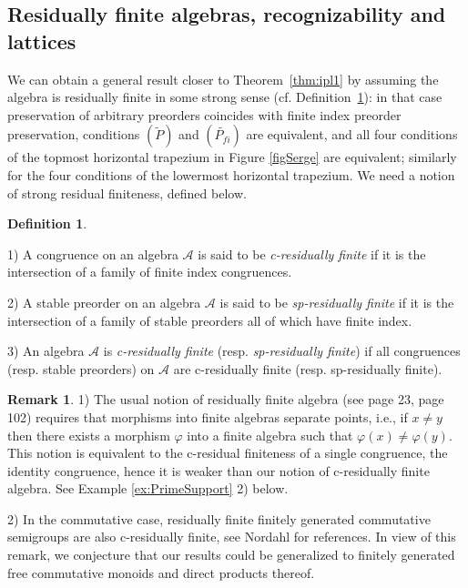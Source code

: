 \documentclass[11pt,a4paper]{article}
\theoremstyle{definition} %
\newtheorem{definition}[theorem]{Definition}
\newtheorem{remark}[theorem]{Remark}
\newcommand\+[1]{\mathcal{#1}} %
\begin{document}
%
\subsection{Residually finite algebras, recognizability and lattices}
\label{ss residually finite}
We can obtain a general result closer to Theorem~\ref{thm:ipl1} 
by assuming   the algebra 
 is residually finite in some strong sense  (cf.\! Definition~\ref{def:residually finite c sp}):  in that case preservation of arbitrary preorders coincides with finite index preorder preservation, conditions $(\widetilde P)$ and $(\widetilde{P_{\textit{fi}}})$ are equivalent, and all four conditions of the topmost horizontal trapezium in Figure \ref{figSerge}
 are equivalent; similarly for the four conditions of the lowermost horizontal trapezium. 
 We need a  notion  of strong residual finiteness, defined below.  
\begin{definition}\label{def:residually finite c sp}

1)  A congruence on an algebra $\+A$ is said to be {\em c-residually finite}
if it is the intersection of a family of finite index congruences.

2) A stable preorder on an algebra $\+A$ is said to be {\em sp-residually finite}
if it is the intersection of a family of stable preorders
all of which have finite index.

3) An algebra $\+A$ is  {\em c-residually finite} (resp. {\em sp-residually finite}) if all congruences (resp.  stable preorders)  on $\+A$ 
are c-residually finite (resp.  sp-residually finite).
\end{definition}
%
\begin{remark} 1) The usual notion of residually finite algebra (see \cite{almeida} page 23, \cite{KaarliPixley} page 102)
requires that morphisms into finite algebras 
separate points, i.e., if $x\neq y$ then there exists a morphism $\varphi$ into a finite algebra 
such that $\varphi(x)\neq\varphi(y)$.
This notion is equivalent to the c-residual finiteness of a single congruence,  the  identity congruence,
hence it is weaker than our notion of c-residually finite algebra. See Example  \ref{ex:PrimeSupport}   2) below. 

2) In the commutative case,  residually finite finitely generated commutative semigroups are also c-residually finite, see Nordahl \cite{N1,N2} for references. In view of this remark, we conjecture that our results could be generalized to finitely generated free commutative monoids and direct products thereof.
\end{remark}
\end{document}
